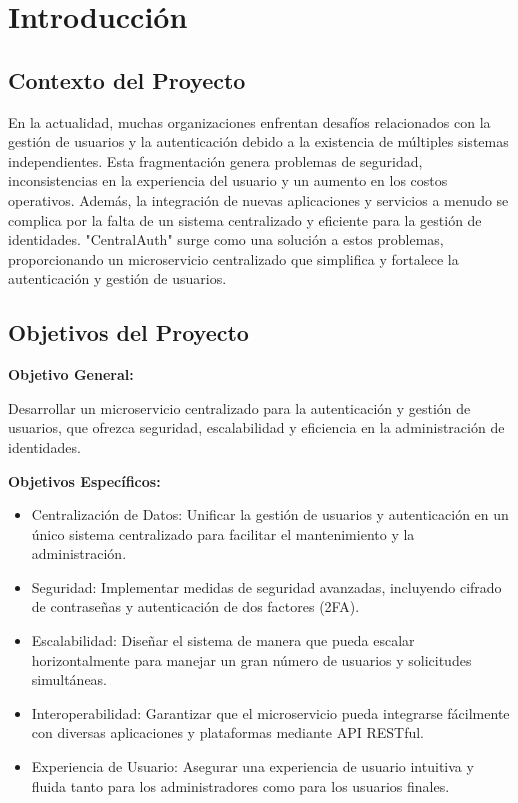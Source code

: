 \documentclass{article}
\begin{document}
\section{Introducción}

\subsection{Contexto del Proyecto}

En la actualidad, muchas organizaciones enfrentan desafíos relacionados con la gestión de usuarios y la autenticación debido a la existencia de múltiples sistemas independientes. Esta fragmentación genera problemas de seguridad, inconsistencias en la experiencia del usuario y un aumento en los costos operativos. Además, la integración de nuevas aplicaciones y servicios a menudo se complica por la falta de un sistema centralizado y eficiente para la gestión de identidades. "CentralAuth" surge como una solución a estos problemas, proporcionando un microservicio centralizado que simplifica y fortalece la autenticación y gestión de usuarios.

\subsection{Objetivos del Proyecto}

\textbf{Objetivo General:}

Desarrollar un microservicio centralizado para la autenticación y gestión de usuarios, que ofrezca seguridad, escalabilidad y eficiencia en la administración de identidades.

\textbf{Objetivos Específicos:}

\begin{itemize}
    \item Centralización de Datos: Unificar la gestión de usuarios y autenticación en un único sistema centralizado para facilitar el mantenimiento y la administración.
    \item Seguridad: Implementar medidas de seguridad avanzadas, incluyendo cifrado de contraseñas y autenticación de dos factores (2FA).
    \item Escalabilidad: Diseñar el sistema de manera que pueda escalar horizontalmente para manejar un gran número de usuarios y solicitudes simultáneas.
    \item Interoperabilidad: Garantizar que el microservicio pueda integrarse fácilmente con diversas aplicaciones y plataformas mediante API RESTful.
    \item Experiencia de Usuario: Asegurar una experiencia de usuario intuitiva y fluida tanto para los administradores como para los usuarios finales.
\end{itemize}
\end{document}

